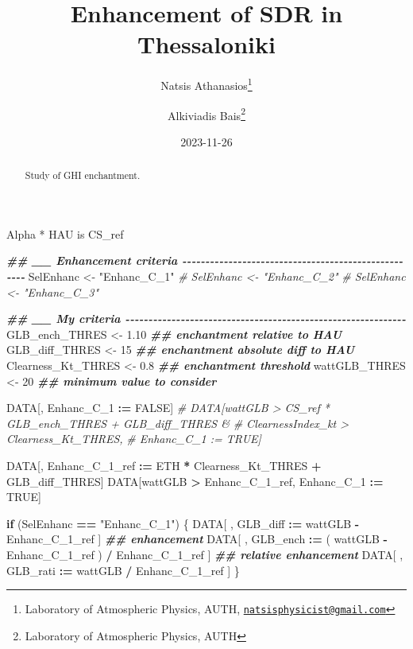 \documentclass[
  10pt,
  a4paper,oneside]{article}
\title{Enhancement of SDR in Thessaloniki}
\author{Natsis Athanasios\footnote{Laboratory of Atmospheric Physics, AUTH, \href{mailto:natsisphysicist@gmail.com}{\nolinkurl{natsisphysicist@gmail.com}}} \and Alkiviadis Bais\footnote{Laboratory of Atmospheric Physics, AUTH}}
\date{2023-11-26}
\newenvironment{Shaded}{\begin{snugshade}}{\end{snugshade}}
\newcommand{\CommentTok}[1]{\textcolor[rgb]{0.56,0.35,0.01}{\textit{#1}}}
\newcommand{\ConstantTok}[1]{\textcolor[rgb]{0.56,0.35,0.01}{#1}}
\newcommand{\ControlFlowTok}[1]{\textcolor[rgb]{0.13,0.29,0.53}{\textbf{#1}}}
\newcommand{\DecValTok}[1]{\textcolor[rgb]{0.00,0.00,0.81}{#1}}
\newcommand{\DocumentationTok}[1]{\textcolor[rgb]{0.56,0.35,0.01}{\textbf{\textit{#1}}}}
\newcommand{\FloatTok}[1]{\textcolor[rgb]{0.00,0.00,0.81}{#1}}
\newcommand{\NormalTok}[1]{#1}
\newcommand{\OtherTok}[1]{\textcolor[rgb]{0.56,0.35,0.01}{#1}}
\newcommand{\SpecialCharTok}[1]{\textcolor[rgb]{0.81,0.36,0.00}{\textbf{#1}}}
\newcommand{\StringTok}[1]{\textcolor[rgb]{0.31,0.60,0.02}{#1}}
\begin{document}
\maketitle
\begin{abstract}
Study of GHI enchantment.
\end{abstract}

{
\hypersetup{linkcolor=}
\setcounter{tocdepth}{4}
\tableofcontents
}
Alpha * HAU is CS\_ref

\begin{Shaded}
\begin{Highlighting}[]
\DocumentationTok{\#\# \_\_ Enhancement criteria  {-}{-}{-}{-}{-}{-}{-}{-}{-}{-}{-}{-}{-}{-}{-}{-}{-}{-}{-}{-}{-}{-}{-}{-}{-}{-}{-}{-}{-}{-}{-}{-}{-}{-}{-}{-}{-}{-}{-}{-}{-}{-}{-}{-}{-}{-}{-}{-}{-}{-}{-}{-}}
\NormalTok{SelEnhanc }\OtherTok{\textless{}{-}} \StringTok{"Enhanc\_C\_1"}
\CommentTok{\# SelEnhanc \textless{}{-} "Enhanc\_C\_2"}
\CommentTok{\# SelEnhanc \textless{}{-} "Enhanc\_C\_3"}

\DocumentationTok{\#\# \_\_ My criteria  {-}{-}{-}{-}{-}{-}{-}{-}{-}{-}{-}{-}{-}{-}{-}{-}{-}{-}{-}{-}{-}{-}{-}{-}{-}{-}{-}{-}{-}{-}{-}{-}{-}{-}{-}{-}{-}{-}{-}{-}{-}{-}{-}{-}{-}{-}{-}{-}{-}{-}{-}{-}{-}{-}{-}{-}{-}{-}{-}{-}{-}}
\NormalTok{GLB\_ench\_THRES     }\OtherTok{\textless{}{-}}  \FloatTok{1.10} \DocumentationTok{\#\# enchantment relative to HAU}
\NormalTok{GLB\_diff\_THRES     }\OtherTok{\textless{}{-}} \DecValTok{15}    \DocumentationTok{\#\# enchantment absolute diff to HAU}
\NormalTok{Clearness\_Kt\_THRES }\OtherTok{\textless{}{-}}  \FloatTok{0.8}  \DocumentationTok{\#\# enchantment threshold}
\NormalTok{wattGLB\_THRES      }\OtherTok{\textless{}{-}} \DecValTok{20}    \DocumentationTok{\#\# minimum value to consider}

\NormalTok{DATA[, Enhanc\_C\_1 }\SpecialCharTok{:=} \ConstantTok{FALSE}\NormalTok{]}
\CommentTok{\# DATA[wattGLB           \textgreater{} CS\_ref * GLB\_ench\_THRES + GLB\_diff\_THRES \&}
\CommentTok{\#      ClearnessIndex\_kt \textgreater{} Clearness\_Kt\_THRES,}
\CommentTok{\#      Enhanc\_C\_1 := TRUE]}

\NormalTok{DATA[, Enhanc\_C\_1\_ref }\SpecialCharTok{:=}\NormalTok{ ETH }\SpecialCharTok{*}\NormalTok{ Clearness\_Kt\_THRES }\SpecialCharTok{+}\NormalTok{ GLB\_diff\_THRES]}
\NormalTok{DATA[wattGLB }\SpecialCharTok{\textgreater{}}\NormalTok{ Enhanc\_C\_1\_ref,}
\NormalTok{     Enhanc\_C\_1 }\SpecialCharTok{:=} \ConstantTok{TRUE}\NormalTok{]}

\ControlFlowTok{if}\NormalTok{ (SelEnhanc }\SpecialCharTok{==} \StringTok{"Enhanc\_C\_1"}\NormalTok{) \{}
\NormalTok{    DATA[ , GLB\_diff }\SpecialCharTok{:=}\NormalTok{   wattGLB }\SpecialCharTok{{-}}\NormalTok{ Enhanc\_C\_1\_ref                    ] }\DocumentationTok{\#\# enhancement}
\NormalTok{    DATA[ , GLB\_ench }\SpecialCharTok{:=}\NormalTok{ ( wattGLB }\SpecialCharTok{{-}}\NormalTok{ Enhanc\_C\_1\_ref ) }\SpecialCharTok{/}\NormalTok{ Enhanc\_C\_1\_ref ] }\DocumentationTok{\#\# relative enhancement}
\NormalTok{    DATA[ , GLB\_rati }\SpecialCharTok{:=}\NormalTok{   wattGLB }\SpecialCharTok{/}\NormalTok{ Enhanc\_C\_1\_ref                    ]}
\NormalTok{\}}



\end{Highlighting}
\end{Shaded}
\end{document}
